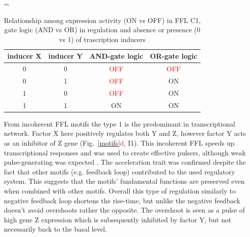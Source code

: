 
\begin{center}
\LTcapwidth=\textwidth
	\begin{longtable}[c]{|c|c|c|c|}
\caption{Relationship among expression activity (ON vs OFF) in FFL C1, gate logic (AND vs OR) in regulation and absence or presence (0 vs 1) of trascription inducers} \label{ANDvsOR} \\

\toprule \multicolumn{1}{|c|}{\textbf{inducer X}} & \multicolumn{1}{c|}{\textbf{inducer Y}}  & \multicolumn{1}{c|}{\textbf{AND-gate logic}} & \multicolumn{1}{c|}{\textbf{OR-gate logic}} \\
\midrule
\endhead

\bottomrule
\endlastfoot

0 & 0 & \textcolor{red}{OFF} & \textcolor{red}{OFF} \\
\hline
0 & 1 & \textcolor{red}{OFF} & \textcolor{mygreen}{ON} \\
\hline
1 & 0 & \textcolor{red}{OFF} & \textcolor{mygreen}{ON} \\
\hline
1 & 1 & \textcolor{mygreen}{ON} & \textcolor{mygreen}{ON} \\
	\end{longtable}
\end{center}


From incoherent FFL motifs the type 1 is the predominant in  transcriptional network.
Factor X here positively regulates both Y and Z, however factor Y acts as an inhibitor of Z gene (Fig.~\ref{motifs}\textcolor{red}{d}, I1).
This incoherent FFL speeds up transcriptional responses and was used to create effective pulsers, although weak pulse-generating was expected \cite{mangan2003structure, basu2004spatiotemporal, mangan2006incoherent}.
The acceleration trait was confirmed despite the fact that other motifs (e.g. feedback loop) contributed to the used regulatory system.
This suggests that the motifs' fundamental functions are preserved even when combined with other motifs.
Overall this type of regulation similarly to negative feedback loop shortens the rise-time, but unlike the negative feedback doesn't avoid overshoots rather the opposite.
The overshoot is seen as a pulse of high gene Z expression which is subsequently inhibited by factor Y, but not necessarily back to the basal level.

